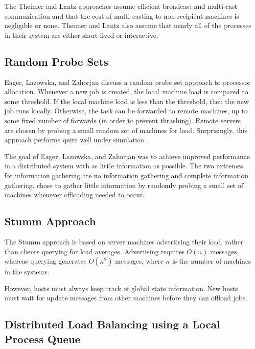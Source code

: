 \documentclass{report}
\begin{document}
The Theimer and Lantz approaches assume efficient broadcast and multi-cast
communication and that the cost of multi-casting to non-recipient machines is
negligible or none.  Theimer and Lantz also assume that nearly all of
the processes in their system are either short-lived or interactive.




\subsection{Random Probe Sets \cite{random_probe}}

Eager, Lazowska, and Zahorjan discuss a random probe set approach to
processor allocation.  Whenever a new job is created, the local machine load
is compared to some threshold.  If the local machine load is less than the
threshold, then the new job runs locally.  Otherwise, the task can be
forwarded to remote machines, up to some fixed number of forwards (in order
to prevent thrashing).  Remote servers are chosen by probing a small random
set of machines for load.  Surprisingly, this approach performs quite well
under simulation.

The goal of Eager, Lazowska, and Zahorjan was to achieve improved
performance in a distributed system with as little information as possible.
The two extremes for information gathering are no information gathering and
complete information gathering.  \cite{random_probe} chose to gather little
information by randomly probing a small set of machines whenever offloading
needed to occur.


\subsection{Stumm Approach \cite{stumm}}

The Stumm approach is based on server machines advertising their load,
rather than clients querying for load averages.  Advertising requires $O(n)$
messages, whereas querying generates $O(n^2)$ messages, where $n$ is the
number of machines in the systems.

However, hosts must always keep track of global state information.  New
hosts must wait for update messages from other machines before they can
offload jobs.

\subsection{Distributed Load Balancing using a Local Process Queue \cite{Hac}}
\end{document}
